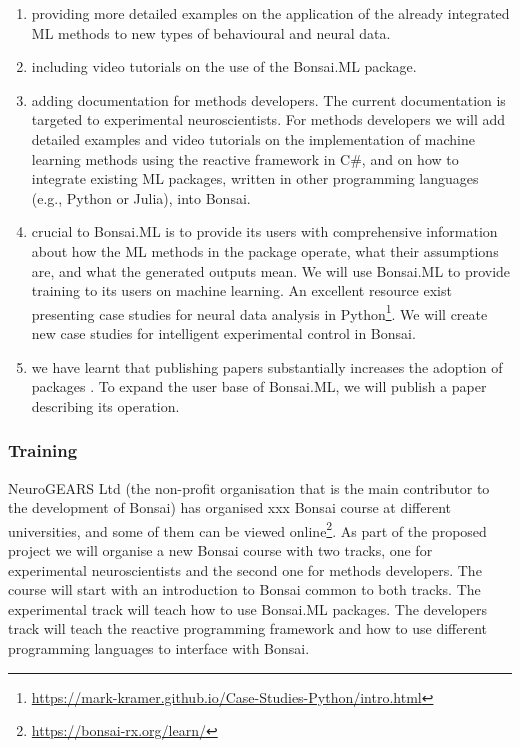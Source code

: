 \begin{enumerate}

    \item providing more detailed examples on the application of the
        already integrated ML methods to new types of behavioural and
        neural data.

    \item including video tutorials on the use of the Bonsai.ML
        package.

    \item adding documentation for methods developers. The current
        documentation is targeted to experimental neuroscientists. For methods
        developers we will add detailed examples and video tutorials on the
        implementation of machine learning methods using the reactive framework
        in C\#, and on how to integrate existing ML packages, written in
        other programming languages (e.g., Python or Julia), into Bonsai.

    \item crucial to Bonsai.ML is to provide its users with comprehensive
        information about how the ML methods in the package operate, what their
        assumptions are, and what the generated outputs mean. We will use
        Bonsai.ML to provide training to its users on machine learning.  An
        excellent resource exist presenting case studies for neural data
        analysis in
        Python\footnote[9]{\url{https://mark-kramer.github.io/Case-Studies-Python/intro.html}}.
        We will create new case studies for intelligent experimental control in
        Bonsai.

    \item we have learnt that publishing papers substantially increases the
        adoption of packages \citep{lopesEtAl15,guilbeaultEtAl21}. To expand
        the user base of Bonsai.ML, we will publish a paper describing its
        operation.

\end{enumerate}

\subsubsection*{Training}

NeuroGEARS Ltd (the non-profit organisation that is the main contributor to the
development of Bonsai) has organised xxx Bonsai course at different
universities, and some of them can be viewed
online\footnote[10]{\url{https://bonsai-rx.org/learn/}}. As part of the
proposed project we will organise a new Bonsai course with two tracks, one for
experimental neuroscientists and the second one for methods developers. The
course will start with an introduction to Bonsai common to both tracks. The
experimental track will teach how to use Bonsai.ML packages. The developers
track will teach the reactive programming framework and how to use different
programming languages to interface with Bonsai.


